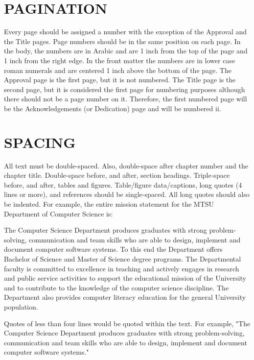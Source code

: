 \documentclass[12pt, oneside]{book}
\begin{document}
\chapter{\textbf{PAGINATION}}
Every page should be assigned a number with the exception of the Approval and the Title pages.  Page numbers should be in the same position on each page.  In the body, the numbers are in Arabic and are 1 inch from the top of the page and 1 inch from the right edge.  In the front matter the numbers are in lower case roman numerals and are centered 1 inch above the bottom of the page.  The Approval page is the first page, but it is not numbered.  The Title page is the second page, but it is considered the first page for numbering purposes although there should not be a page number on it.  Therefore, the first numbered page will be the Acknowledgements (or Dedication) page and will be numbered ii. 

\chapter{\textbf{SPACING}}
All text must be double-spaced.  Also, double-space after chapter number and the chapter title.  Double-space before, and after, section headings.  Triple-space before, and after, tables and figures.  Table/figure data/captions, long quotes (4 lines or more), and references should be single-spaced.  All long quotes should also be indented.  For example, the entire mission statement for the MTSU Department of Computer Science is:

\setlength{\leftskip}{1cm} %
\setlength{\rightskip}{1cm}

The Computer Science Department produces graduates with strong problem-solving, communication and team skills who are able to design, implement and document computer software systems. To this end the Department offers Bachelor of Science and Master of Science degree programs. The Departmental faculty is committed to excellence in teaching and actively engages in research and public service activities to support the educational mission of the University and to contribute to the knowledge of the computer science discipline. The Department also provides computer literacy education for the general University population.

\setlength{\leftskip}{0pt} %

Quotes of less than four lines would be quoted within the text.  For example, "The Computer Science Department produces graduates with strong problem-solving, communication and team skills who are able to design, implement and document computer software systems."
\end{document}
